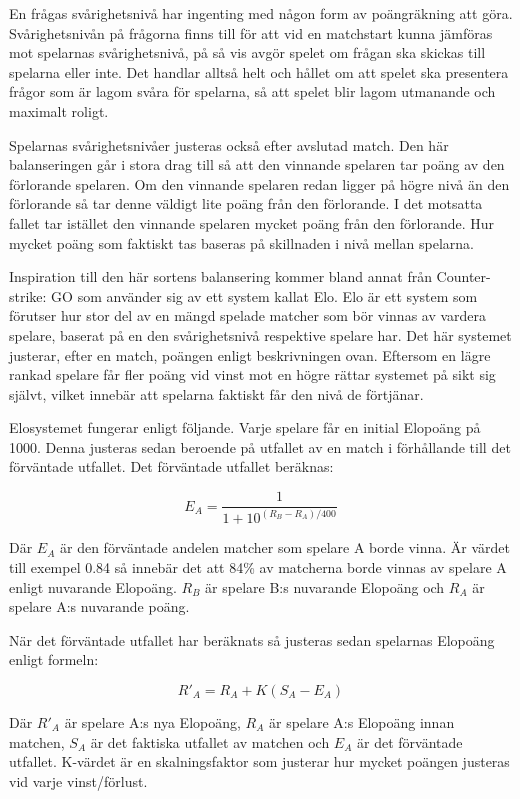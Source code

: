 \documentclass[a4paper, 11pt]{article}
\begin{document}
En frågas svårighetsnivå har ingenting med någon form av poängräkning att göra. Svårighetsnivån på frågorna finns till för att vid en matchstart kunna jämföras mot spelarnas svårighetsnivå, på så vis avgör spelet om frågan ska skickas till spelarna eller inte. Det handlar alltså helt och hållet om att spelet ska presentera frågor som är lagom svåra för spelarna, så att spelet blir lagom utmanande och maximalt roligt.

Spelarnas svårighetsnivåer justeras också efter avslutad match. Den här balanseringen går i stora drag till så att den vinnande spelaren tar poäng av den förlorande spelaren. Om den vinnande spelaren redan ligger på högre nivå än den förlorande så tar denne väldigt lite poäng från den förlorande. I det motsatta fallet tar istället den vinnande spelaren mycket poäng från den förlorande. Hur mycket poäng som faktiskt tas baseras på skillnaden i nivå mellan spelarna. 

Inspiration till den här sortens balansering kommer bland annat från Counter-strike: GO \cite{cs} som använder sig av ett system kallat Elo\cite{elo}. Elo är ett system som förutser hur stor del av en mängd spelade matcher som bör vinnas av vardera spelare, baserat på en den svårighetsnivå respektive spelare har. Det här systemet justerar, efter en match, poängen enligt beskrivningen ovan. Eftersom en lägre rankad spelare får fler poäng vid vinst mot en högre rättar systemet på sikt sig självt, vilket innebär att spelarna faktiskt får den nivå de förtjänar.

Elosystemet fungerar enligt följande. Varje spelare får en initial Elopoäng på 1000. Denna justeras sedan beroende på utfallet av en match i förhållande till det förväntade utfallet. Det förväntade utfallet beräknas:

$$E_A = \frac{1}{1+10^{(R_B-R_A)/400}}$$

Där $E_A$ är den förväntade andelen matcher som spelare A borde vinna. Är värdet till exempel 0.84 så innebär det att 84\% av matcherna borde vinnas av spelare A enligt nuvarande Elopoäng. $R_B$ är spelare B:s nuvarande Elopoäng och $R_A$ är spelare A:s nuvarande poäng.

När det förväntade utfallet har beräknats så justeras sedan spelarnas Elopoäng enligt formeln:

$$R'_A = R_A + K(S_A-E_A)$$

Där $R'_A$ är spelare A:s nya Elopoäng, $R_A$ är spelare A:s Elopoäng innan matchen, $S_A$ är det faktiska utfallet av matchen och $E_A$ är det förväntade utfallet. K-värdet är en skalningsfaktor som justerar hur mycket poängen justeras vid varje vinst/förlust.
\end{document}

